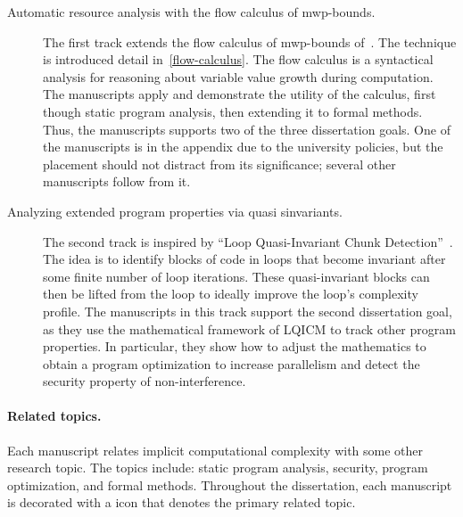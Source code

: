 \begin{description}
\item[Automatic resource analysis with the flow calculus of mwp-bounds.]
The first track extends the flow calculus of mwp-bounds of~\textcite{jones2009}.
The technique is introduced detail in~\autoref{flow-calculus}.
The flow calculus is a syntactical analysis for reasoning about variable value growth during computation.
The manuscripts apply and demonstrate the utility of the calculus, first though static program analysis, then extending it to formal methods.
Thus, the manuscripts supports two of the three dissertation goals.
One of the manuscripts is in the appendix due to the university policies, but the placement should not distract from its significance;
several other manuscripts follow from it.

\item[Analyzing extended program properties via quasi sinvariants.]
The second track is inspired by \enquote{Loop Quasi-Invariant Chunk Detection}~\cite{moyen20172}.
The idea is to identify blocks of code in loops that become invariant after some finite number of loop iterations.
These quasi-invariant blocks can then be lifted from the loop to ideally improve the loop's complexity profile.
The manuscripts in this track support the second dissertation goal,
as they use the mathematical framework of LQICM to track other program properties.
In particular, they show how to adjust the mathematics to obtain a program optimization to increase parallelism and detect the security property of non-interference.
\end{description}

\paragraph*{Related topics.}
Each manuscript relates implicit computational complexity with some other research topic.
The topics include: static program analysis, security, program optimization, and formal methods.
Throughout the dissertation, each manuscript is decorated with a icon that denotes the primary related topic.

